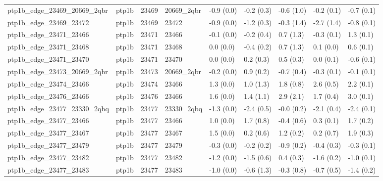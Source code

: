 \begin{tabular}{lllllllll}
ptp1b\_edge\_23469\_20669\_2qbr      &     ptp1b &       23469 &  20669\_2qbr &  -0.9 (0.0) &        -0.2 (0.3) &  -0.6 (1.0) &  -0.2 (0.1) &  -0.7 (0.1) \\
ptp1b\_edge\_23469\_23472           &     ptp1b &       23469 &       23472 &  -0.9 (0.0) &        -1.2 (0.3) &  -0.3 (1.4) &  -2.7 (1.4) &  -0.8 (0.1) \\
ptp1b\_edge\_23471\_23466           &     ptp1b &       23471 &       23466 &  -0.1 (0.0) &        -0.2 (0.4) &   0.7 (1.3) &  -0.3 (0.1) &   1.3 (0.1) \\
ptp1b\_edge\_23471\_23468           &     ptp1b &       23471 &       23468 &   0.0 (0.0) &        -0.4 (0.2) &   0.7 (1.3) &   0.1 (0.0) &   0.6 (0.1) \\
ptp1b\_edge\_23471\_23470           &     ptp1b &       23471 &       23470 &   0.0 (0.0) &         0.2 (0.3) &   0.5 (0.3) &   0.0 (0.1) &  -0.6 (0.1) \\
ptp1b\_edge\_23473\_20669\_2qbr      &     ptp1b &       23473 &  20669\_2qbr &  -0.2 (0.0) &         0.9 (0.2) &  -0.7 (0.4) &  -0.3 (0.1) &  -0.1 (0.1) \\
ptp1b\_edge\_23474\_23466           &     ptp1b &       23474 &       23466 &   1.3 (0.0) &         1.0 (1.3) &   1.8 (0.8) &   2.6 (0.5) &   2.2 (0.1) \\
ptp1b\_edge\_23476\_23466           &     ptp1b &       23476 &       23466 &   1.6 (0.0) &         1.4 (1.1) &   2.9 (2.1) &   1.7 (0.4) &   3.0 (0.1) \\
ptp1b\_edge\_23477\_23330\_2qbq      &     ptp1b &       23477 &  23330\_2qbq &  -1.3 (0.0) &        -2.4 (0.5) &  -0.0 (0.2) &  -2.1 (0.4) &  -2.4 (0.1) \\
ptp1b\_edge\_23477\_23466           &     ptp1b &       23477 &       23466 &   1.0 (0.0) &         1.7 (0.8) &  -0.4 (0.6) &   0.3 (0.1) &   1.7 (0.2) \\
ptp1b\_edge\_23477\_23467           &     ptp1b &       23477 &       23467 &   1.5 (0.0) &         0.2 (0.6) &   1.2 (0.2) &   0.2 (0.7) &   1.9 (0.3) \\
ptp1b\_edge\_23477\_23479           &     ptp1b &       23477 &       23479 &  -0.3 (0.0) &        -0.2 (0.2) &  -0.9 (0.2) &  -0.4 (0.3) &  -0.3 (0.1) \\
ptp1b\_edge\_23477\_23482           &     ptp1b &       23477 &       23482 &  -1.2 (0.0) &        -1.5 (0.6) &   0.4 (0.3) &  -1.6 (0.2) &  -1.0 (0.1) \\
ptp1b\_edge\_23477\_23483           &     ptp1b &       23477 &       23483 &  -1.0 (0.0) &        -0.6 (1.3) &  -0.3 (0.8) &  -0.7 (0.5) &  -1.4 (0.2) \\

\end{tabular}
